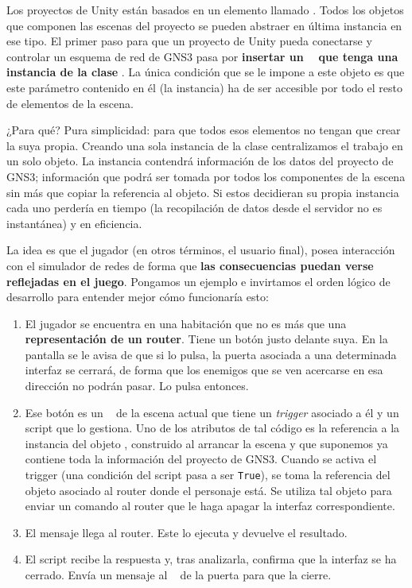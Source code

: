Los proyectos de Unity están basados en un elemento llamado \GAOBJ. Todos los objetos que componen las escenas del proyecto se pueden abstraer en última instancia en ese tipo. El primer paso para que un proyecto de Unity pueda conectarse y controlar un esquema de red de GNS3 pasa por \textbf{insertar un \GAOBJ~ que tenga una instancia de la clase \GNSCS}. La única condición que se le impone a este objeto es que este parámetro contenido en él (la instancia) ha de ser accesible por todo el resto de elementos de la escena.

¿Para qué? Pura simplicidad: para que todos esos elementos no tengan que crear la suya propia. Creando una sola instancia de la clase centralizamos el trabajo en un solo objeto. La instancia contendrá información de los datos del proyecto de GNS3; información que podrá ser tomada por todos los componentes de la escena sin más que copiar la referencia al objeto. Si estos decidieran su propia instancia cada uno perdería en tiempo (la recopilación de datos desde el servidor no es instantánea) y en eficiencia.

La idea es que el jugador (en otros términos, el usuario final), posea interacción con el simulador de redes de forma que \textbf{las consecuencias puedan verse reflejadas en el juego}. Pongamos un ejemplo e invirtamos el orden lógico de desarrollo para entender mejor cómo funcionaría esto:

\begin{enumerate}
\item El jugador se encuentra en una habitación que no es más que una \textbf{representación de un router}. Tiene un botón justo delante suya. En la pantalla se le avisa de que si lo pulsa, la puerta asociada a una determinada interfaz se cerrará, de forma que los enemigos que se ven acercarse en esa dirección no podrán pasar. Lo pulsa entonces.
\item Ese botón es un \GAOBJ~ de la escena actual que tiene un \textit{trigger} asociado a él y un script que lo gestiona. Uno de los atributos de tal código es la referencia a la instancia del objeto \GNSCS, construido al arrancar la escena y que suponemos ya contiene toda la información del proyecto de GNS3. Cuando se activa el trigger (una condición del script pasa a ser \texttt{True}), se toma la referencia del objeto asociado al router donde el personaje está. Se utiliza tal objeto para enviar un comando al router que le haga apagar la interfaz correspondiente.
\item El mensaje llega al router. Este lo ejecuta y devuelve el resultado.
\item El script recibe la respuesta y, tras analizarla, confirma que la interfaz se ha cerrado. Envía un mensaje al \GAOBJ~ de la puerta para que la cierre.
\end{enumerate}

